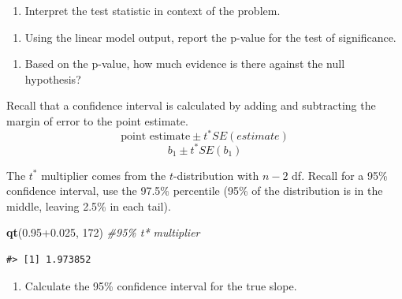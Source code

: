 \documentclass[
]{report}
\newenvironment{Shaded}{\begin{snugshade}}{\end{snugshade}}
\newcommand{\CommentTok}[1]{\textcolor[rgb]{0.56,0.35,0.01}{\textit{#1}}}
\newcommand{\DecValTok}[1]{\textcolor[rgb]{0.00,0.00,0.81}{#1}}
\newcommand{\FloatTok}[1]{\textcolor[rgb]{0.00,0.00,0.81}{#1}}
\newcommand{\KeywordTok}[1]{\textcolor[rgb]{0.13,0.29,0.53}{\textbf{#1}}}
\newcommand{\NormalTok}[1]{#1}
\providecommand{\tightlist}{%
  \setlength{\itemsep}{0pt}\setlength{\parskip}{0pt}}
\begin{document}
\vspace{1in}

\begin{enumerate}
\def\labelenumi{\arabic{enumi}.}
\setcounter{enumi}{12}
\tightlist
\item
  Interpret the test statistic in context of the problem.
\end{enumerate}

\vspace{1in}

\begin{enumerate}
\def\labelenumi{\arabic{enumi}.}
\setcounter{enumi}{13}
\tightlist
\item
  Using the linear model output, report the p-value for the test of significance.
\end{enumerate}

\vspace{0.5in}

\begin{enumerate}
\def\labelenumi{\arabic{enumi}.}
\setcounter{enumi}{14}
\tightlist
\item
  Based on the p-value, how much evidence is there against the null hypothesis?
\end{enumerate}

\vspace{0.5in}

Recall that a confidence interval is calculated by adding and subtracting the margin of error to the point estimate.\\
\[\mbox{point estimate}\pm t^*SE(estimate)\]
\[b_1 \pm t^* SE(b_1)\]

The \(t^*\) multiplier comes from the \(t\)-distribution with \(n-2\) df. Recall for a 95\% confidence interval, use the 97.5\% percentile (95\% of the distribution is in the middle, leaving 2.5\% in each tail).

\begin{Shaded}
\begin{Highlighting}[]
\KeywordTok{qt}\NormalTok{(}\FloatTok{0.95+0.025}\NormalTok{, }\DecValTok{172}\NormalTok{) }\CommentTok{\#95\% t* multiplier }
\end{Highlighting}
\end{Shaded}

\begin{verbatim}
#> [1] 1.973852
\end{verbatim}

\begin{enumerate}
\def\labelenumi{\arabic{enumi}.}
\setcounter{enumi}{15}
\tightlist
\item
  Calculate the 95\% confidence interval for the true slope.
  \vspace{1in}
\end{enumerate}
\end{document}
